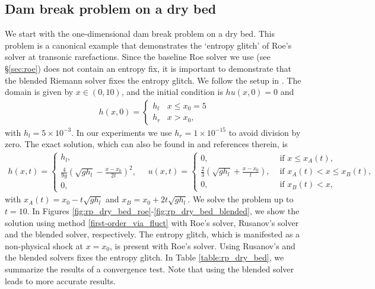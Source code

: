 \documentclass[preprint, 11pt]{article}
\begin{document}
\subsection{Dam break problem on a dry bed}\label{sec:rp_dry_bed}
We start with the one-dimensional dam break problem on a dry bed.
This problem is a canonical example that demonstrates the `entropy glitch' of Roe's solver
at transonic rarefactions. Since the baseline Roe solver we use (see \S\ref{sec:roe}) does not contain
an entropy fix, it is important to demonstrate that the blended Riemann solver fixes the entropy glitch.
We follow the setup in \cite[\S 4.1.2]{delestre2013swashes}.
The domain is given by $x\in(0,10)$, and the initial condition is $hu(x,0)=0$ and
\begin{align*}
  h(x,0)=
  \begin{cases}
    h_l & x\leq x_0=5 \\
    h_r & x >x_0,
  \end{cases}
\end{align*}
with $h_l=5\times 10^{-3}$.  In our experiments we use $h_r=1\times
10^{-15}$ to avoid division by zero.
The exact solution, which can also be found in \cite{delestre2013swashes} and references therein, is
\begin{align*}
  h(x,t) =
  \begin{cases}
    h_l, \\
    \frac{4}{9g}\left(\sqrt{gh_l}-\frac{x-x_0}{2t}\right)^2, \\
    0,
  \end{cases}
\quad
  u(x,t) =
  \begin{cases}
    0, &\mbox{ if } x\leq x_A(t), \\
    \frac{2}{3}\left(\sqrt{gh_l}+\frac{x-x_0}{t}\right), & \mbox{ if } x_A(t) < x\leq x_B(t), \\
    0, &\mbox{ if } x_B(t) < x,
  \end{cases}
\end{align*}
with $x_A(t)=x_0 - t\sqrt{gh_l}$ and $x_B=x_0+2t\sqrt{gh_l}$.
We solve the problem up to $t=10$.
In Figures \ref{fig:rp_dry_bed_roe}-\ref{fig:rp_dry_bed_blended},
we show the solution using method \eqref{first-order_via_fluct}
with Roe's solver, Rusanov's solver and the blended solver, respectively.
The entropy glitch, which is manifested as a non-physical shock at $x=x_0$,
is present with Roe's solver. Using Rusanov's and the blended solvers
fixes the entropy glitch.
In Table \ref{table:rp_dry_bed}, we summarize the results of a convergence test.
Note that using the blended solver leads to more accurate results.
\end{document}
